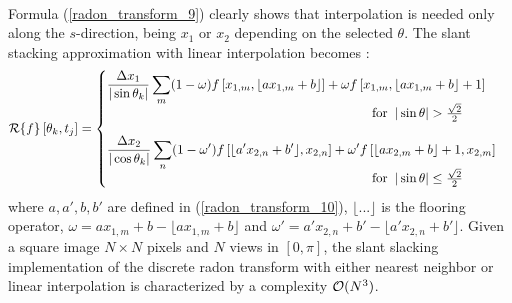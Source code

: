 {\begin{equation}
\begin{split}
\end{split}  
\end{equation}
Formula (\ref{radon_transform_9}) clearly shows that interpolation is needed only along the $s$-direction,
being $x_{1}$ or $x_{2}$ depending on the selected $\theta$. The slant stacking approximation
with linear interpolation becomes \cite{Toft1996}:
\begin{equation}
    \hspace*{0cm}\Radon\{f\}\left[\theta_{k},t_{j}\right] = \begin{cases}
                                                \displaystyle \frac{\Delta x_{1}}{|\sin\theta_{k}|} \sum\limits_{m}(1-\omega)f\left[x_{1,m},\lfloor ax_{1,m}+b \rfloor\right] 
                                                 + \omega f\left[x_{1,m},\lfloor ax_{1,m}+b \rfloor + 1\right] \\[-0.1em] \hspace{7.2cm} \text{for} \hspace{0.2cm}|\sin\theta| > \frac{\sqrt{2}}{2}\\[1em]
                                                \displaystyle \frac{\Delta x_{2}}{|\cos\theta_{k}|} \sum\limits_{n}(1-\omega')f\left[\lfloor a'x_{2,n}+b'\rfloor,x_{2,n}\right] 
                                                 + \omega' f\left[\lfloor ax_{2,m}+b \rfloor + 1,x_{2,m}\right] \\[-0.1em] \hspace{7.2cm} \text{for} \hspace{0.2cm}|\sin\theta| \leq \frac{\sqrt{2}}{2} 
                                               \end{cases}
  \label{radon_transform_11} 
\end{equation}
where $a, a', b, b'$ are defined in (\ref{radon_transform_10}), $\lfloor...\rfloor$ is the flooring operator,
$\omega = ax_{1,m}+b - \lfloor ax_{1,m}+b\rfloor$ and $\omega' = a'x_{2,n}+b' - \lfloor a'x_{2,n}+b'\rfloor$.
Given a square image $N \times N$ pixels and $N$ views in $[0,\pi]$, the slant slacking implementation of the discrete
radon transform with either nearest neighbor or linear interpolation is characterized by a complexity $\operatorname{\mathcal{O}}(N^{3})$.


}
